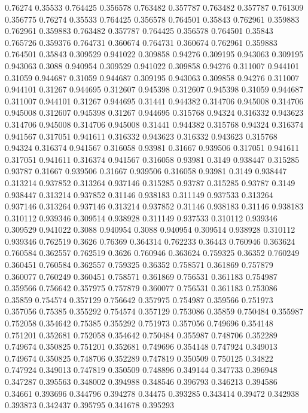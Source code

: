 0.76274 0.35533
0.764425 0.356578
0.763482 0.357787
0.763482 0.357787
0.761309 0.356775
0.76274 0.35533
0.764425 0.356578
0.764501 0.35843
0.762961 0.359883
0.762961 0.359883
0.763482 0.357787
0.764425 0.356578
0.764501 0.35843
0.765726 0.359376
0.764731 0.360674
0.764731 0.360674
0.762961 0.359883
0.764501 0.35843
0.309529 0.941022
0.309858 0.94276
0.309195 0.943063
0.309195 0.943063
0.3088 0.940954
0.309529 0.941022
0.309858 0.94276
0.311007 0.944101
0.31059 0.944687
0.31059 0.944687
0.309195 0.943063
0.309858 0.94276
0.311007 0.944101
0.31267 0.944695
0.312607 0.945398
0.312607 0.945398
0.31059 0.944687
0.311007 0.944101
0.31267 0.944695
0.31441 0.944382
0.314706 0.945008
0.314706 0.945008
0.312607 0.945398
0.31267 0.944695
0.315768 0.94324
0.316332 0.943623
0.314706 0.945008
0.314706 0.945008
0.31441 0.944382
0.315768 0.94324
0.316374 0.941567
0.317051 0.941611
0.316332 0.943623
0.316332 0.943623
0.315768 0.94324
0.316374 0.941567
0.316058 0.93981
0.31667 0.939506
0.317051 0.941611
0.317051 0.941611
0.316374 0.941567
0.316058 0.93981
0.3149 0.938447
0.315285 0.93787
0.31667 0.939506
0.31667 0.939506
0.316058 0.93981
0.3149 0.938447
0.313214 0.937852
0.313264 0.937146
0.315285 0.93787
0.315285 0.93787
0.3149 0.938447
0.313214 0.937852
0.31146 0.938183
0.311149 0.937533
0.313264 0.937146
0.313264 0.937146
0.313214 0.937852
0.31146 0.938183
0.31146 0.938183
0.310112 0.939346
0.309514 0.938928
0.311149 0.937533
0.310112 0.939346
0.309529 0.941022
0.3088 0.940954
0.3088 0.940954
0.309514 0.938928
0.310112 0.939346
0.762519 0.3626
0.76369 0.364314
0.762233 0.36443
0.760946 0.363624
0.760584 0.362557
0.762519 0.3626
0.760946 0.363624
0.759325 0.36352
0.760249 0.360451
0.760584 0.362557
0.759325 0.36352
0.758571 0.361869
0.757879 0.360077
0.760249 0.360451
0.758571 0.361869
0.756531 0.361183
0.754987 0.359566
0.756642 0.357975
0.757879 0.360077
0.756531 0.361183
0.753086 0.35859
0.754574 0.357129
0.756642 0.357975
0.754987 0.359566
0.751973 0.357056
0.75385 0.355292
0.754574 0.357129
0.753086 0.35859
0.750484 0.355987
0.752058 0.354642
0.75385 0.355292
0.751973 0.357056
0.749696 0.354148
0.751201 0.352681
0.752058 0.354642
0.750484 0.355987
0.748706 0.352289
0.749674 0.350825
0.751201 0.352681
0.749696 0.354148
0.747924 0.349013
0.749674 0.350825
0.748706 0.352289
0.747819 0.350509
0.750125 0.34822
0.747924 0.349013
0.747819 0.350509
0.748896 0.349144
0.347733 0.396948
0.347287 0.395563
0.348002 0.394988
0.348546 0.396793
0.346213 0.394586
0.34661 0.393696
0.344796 0.394278
0.34475 0.393285
0.343414 0.39472
0.342938 0.393873
0.342437 0.395795
0.341678 0.395293
